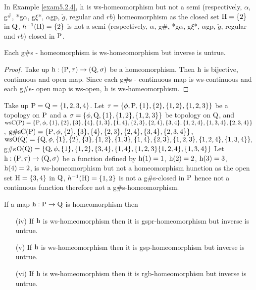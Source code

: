 \begin{exm}\label{exam5.2.6}
In Example \ref{exam5.2.4}, $\mathrm{h}$ is ws-homeomorphism but not a semi (respectively, $\alpha$, g$^{\#}$, *g$\alpha$, g$\xi$*, $\alpha$gp, $\ddot{g}$, regular and $rb$) homeomorphism as the closed set $\mathrm{H}=\{2\}$ in $\mathrm{Q}$, $h^{-1} (\mathrm{H})=\{2\}$ is not a semi (respectively, $\alpha$, g\#, *g$\alpha$, g$\xi$*, $\alpha$gp, $\ddot{g}$, regular and $rb$) closed in $\mathrm{P}$.
\end{exm}

\begin{thm}\label{thm5.2.7}
Each g\#s - homeomorphism is ws-homeomorphism but inverse is untrue.
\end{thm}

\begin{proof}
Take up $\mathrm{h}: (\mathrm{P}, \tau) \to (\mathrm{Q}, \sigma)$ be a homeomorphism. Then $\mathrm{h}$ is bijective, continuous and open map. Since each g\#s - continuous map is ws-continuous and each g\#s- open map is ws-open, $\mathrm{h}$ is ws-homeomorphism.
\end{proof}

\begin{exm}\label{exam5.2.8}
Take up $\mathrm{P}=\mathrm{Q}= \{1, 2, 3, 4\}$. Let $\tau= \{\phi, \TSP, \{1\}, \{2\}, \{1, 2\},\break \{1,2,3\}\}$ be a topology on $\mathrm{P}$ and a $\sigma=\{\phi,\mathrm{Q},\{1\},\{1,2\},\{1,2,3\}\}$ be topology on $\mathrm{Q}$, and $\ws\TSC(\TSP)=\{\TSP,\phi,\{1\},\{2\},\{3\},\{4\},\{1,3\},\{1,4\},\{2,3\},\{2,4\},\{3,4\},\{1,2,4\},\break \{1,3,4\},\{2,3,4\}\}$, $\text{g\#s}\mathrm{C}(\mathrm{P})=\{\mathrm{P}, \phi,\{2\},\{3\},\{4\},\{2,3\},\{2,4\},\{3,4\},\{2,3,4\}\}$,\break $\mathrm{ws}\mathrm{O}(\mathrm{Q})=\{\mathrm{Q}, \phi, \{1\},\{2\},\{3\},\{1,2\}, \{1,3\},\{1,4\},\{2,3\},\{1,2,3\}, \{1,2,4\}, \{1,3,4\}\},$ g\#s$\mathrm{O}(\mathrm{Q})=\{\mathrm{Q},\phi,\{1\},\{1,2\},\{3,4\},\{1,4\},\{1,2,3\}\{1,2,4\},\{1,3,4\}\}$ Let $\TSh: (\TSP, \tau )\break \to (\TSQ, \sigma)$ be a function defined by $\mathrm{h}(1)= 1$, $\mathrm{h}(2)=2$, $\mathrm{h}(3)=3$, $\mathrm{h}(4)=2$, is ws-homeomorphism but not a homeomorphism hunction as the open set $\mathrm{H}=\{3,4\}$ in $\mathrm{Q}$, $h^{-1} (\mathrm{H})=\{1,2\}$ is not a g\#s-closed in $\mathrm{P}$ hence not a continuous function therefore not a g\#s-homeomorphism.
\end{exm}

\begin{thm}\label{thm5.2.9}
If a map $\mathrm{h}: \mathrm{P}\to \mathrm{Q}$ is homeomorphism then
\begin{itemize}
\item[(iv)] If $\mathrm{h}$ is ws-homeomorphism then it is gspr-homeomorphism but inverse is untrue.
\item[(v)] If $\mathrm{h}$ is ws-homeomorphism then it is gsp-homeomorphism but inverse is untrue.
\item[(vi)] If $\mathrm{h}$ is ws-homeomorphism then it is rgb-homeomorphism but inverse is untrue.
\end{itemize}
\end{thm}

